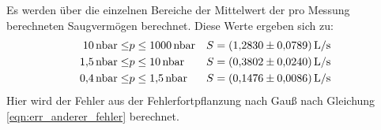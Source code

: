     \noindent Es werden über die einzelnen Bereiche der Mittelwert der pro Messung berechneten Saugvermögen berechnet. Diese Werte ergeben sich zu:
    \begin{align*}
      \SI{10}{\nano\bar} \leq &p \leq \SI{1000}{\nano\bar} & S &= \SI{1.2830 \pm 0.0789}{L\per\second} \\
      \SI{1.5}{\nano\bar} \leq &p \leq \SI{10}{\nano\bar}& S &= \SI{0.3802 \pm 0.0240}{L\per\second} \\
      \SI{0.4}{\nano\bar} \leq &p \leq \SI{1.5}{\nano\bar} & S &= \SI{0.1476 \pm 0.0086}{L\per\second}
    \end{align*}
    Hier wird der Fehler aus der Fehlerfortpflanzung nach Gauß nach Gleichung \eqref{eqn:err_anderer_fehler} berechnet. 